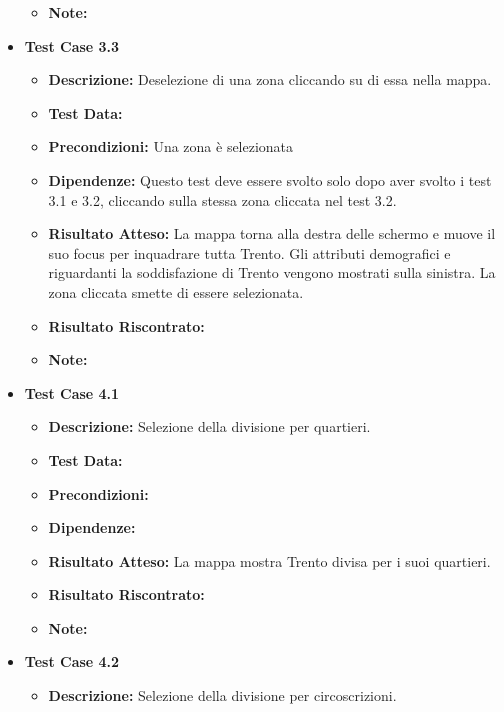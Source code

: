 \begin{itemize}
\begin{itemize}
                    \item \textbf{Note:}
                \end{itemize}
            \item \textbf{Test Case 3.3}
                \begin{itemize}
                    \item \textbf{Descrizione:} Deselezione di una zona cliccando su di essa nella mappa.
                    \item \textbf{Test Data:}
                    \item \textbf{Precondizioni:} Una zona è selezionata
                    \item \textbf{Dipendenze:} Questo test deve essere svolto solo dopo aver svolto i test 3.1 e 3.2, cliccando sulla stessa zona cliccata nel test 3.2.
                    \item \textbf{Risultato Atteso:} La mappa torna alla destra delle schermo e muove il suo focus per inquadrare tutta Trento. Gli attributi demografici e riguardanti la soddisfazione di Trento vengono mostrati sulla sinistra. La zona cliccata smette di essere selezionata.
                    \item \textbf{Risultato Riscontrato:}
                    \item \textbf{Note:}
                \end{itemize}  
            \item \textbf{Test Case 4.1}
                \begin{itemize}
                    \item \textbf{Descrizione:} Selezione della divisione per quartieri.
                    \item \textbf{Test Data:}
                    \item \textbf{Precondizioni:} 
                    \item \textbf{Dipendenze:}
                    \item \textbf{Risultato Atteso:} La mappa mostra Trento divisa per i suoi quartieri.
                    \item \textbf{Risultato Riscontrato:}
                    \item \textbf{Note:}
                \end{itemize}
            \item \textbf{Test Case 4.2}
                \begin{itemize}
                    \item \textbf{Descrizione:} Selezione della divisione per circoscrizioni.

\end{itemize}
\end{itemize}
